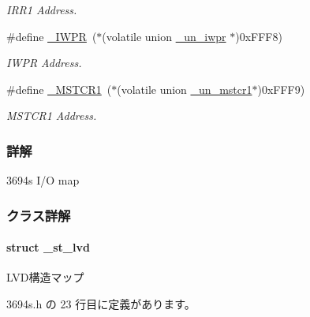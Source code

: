 \begin{DoxyCompactItemize}
\begin{DoxyCompactList}\small\item\em I\+R\+R1 Address. \end{DoxyCompactList}\item 
\#define \hyperlink{3694s_8h_aaf4bef82ff6e916be9127c3efe5135b7_aaf4bef82ff6e916be9127c3efe5135b7}{\+\_\+\+I\+W\+P\+R}~($\ast$(volatile union  \hyperlink{3694s_8h_d3/da9/union__un__iwpr}{\+\_\+un\+\_\+iwpr}  $\ast$)0x\+F\+F\+F8)
\begin{DoxyCompactList}\small\item\em I\+W\+P\+R Address. \end{DoxyCompactList}\item 
\#define \hyperlink{3694s_8h_ad74b69984a9ac2cb02233895e8ceecde_ad74b69984a9ac2cb02233895e8ceecde}{\+\_\+\+M\+S\+T\+C\+R1}~($\ast$(volatile union  \hyperlink{3694s_8h_d5/de9/union__un__mstcr1}{\+\_\+un\+\_\+mstcr1}$\ast$)0x\+F\+F\+F9)
\begin{DoxyCompactList}\small\item\em M\+S\+T\+C\+R1 Address. \end{DoxyCompactList}\end{DoxyCompactItemize}


\subsubsection{詳解}
3694s I/\+O map 

 

\subsubsection{クラス詳解}
\label{struct__st__lvd}
\paragraph{struct \+\_\+st\+\_\+lvd}
L\+V\+D構造マップ 

 3694s.\+h の 23 行目に定義があります。



